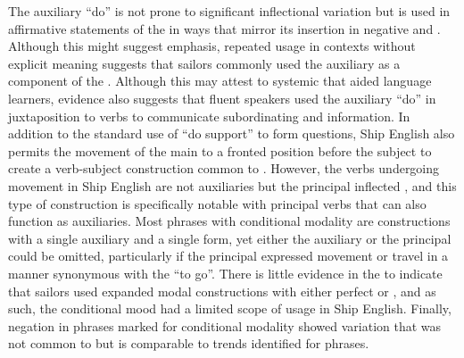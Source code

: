 The auxiliary “do” is not prone to significant inflectional variation but is used in affirmative statements of the  in ways that mirror its insertion in negative and . Although this might suggest emphasis, repeated usage in contexts without explicit  meaning suggests that sailors commonly used the auxiliary as a component of the . Although this may attest to systemic  that aided language learners, evidence also suggests that fluent speakers used the auxiliary “do” in juxtaposition to  verbs to communicate subordinating and  information. In addition to the standard use of “do support” to form questions, Ship English also permits the movement of the main  to a fronted position before the subject to create a verb-subject construction common to . However, the verbs undergoing movement in Ship English are not auxiliaries but the principal inflected , and this type of construction is specifically notable with principal verbs that can also function as auxiliaries. Most  phrases with conditional modality are constructions with a single auxiliary and a single  form, yet either the auxiliary or the principal  could be omitted, particularly if the principal  expressed movement or travel in a manner synonymous with the  “to go”. There is little evidence in the  to indicate that sailors used expanded modal constructions with either perfect or , and as such, the conditional mood had a limited scope of usage in Ship English. Finally, negation in  phrases marked for conditional modality showed variation that was not common to  but is comparable to trends identified for  phrases. 


